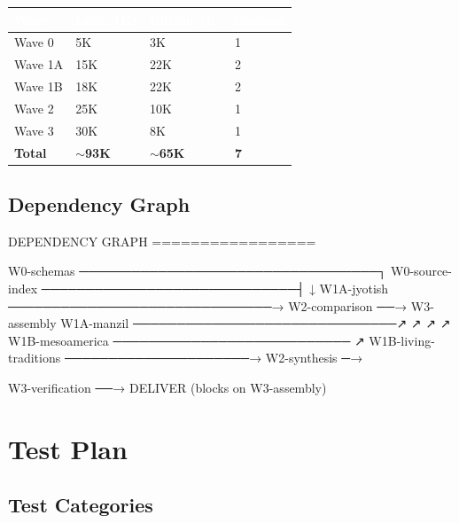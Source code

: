 \documentclass[11pt,letterpaper]{article}
\newcommand{\tableheader}[1]{\textbf{\sffamily\textcolor{white}{#1}}}
\begin{document}
\begin{center}
\begin{tabularx}{\textwidth}{L{3cm}C{2cm}C{2cm}C{2cm}}
\toprule
{}
\tableheader{Wave} & \tableheader{Input (K)} & \tableheader{Output (K)} & \tableheader{Sessions} \\
\midrule
Wave 0 & 5K & 3K & 1 \\
Wave 1A & 15K & 22K & 2 \\
Wave 1B & 18K & 22K & 2 \\
Wave 2 & 25K & 10K & 1 \\
Wave 3 & 30K & 8K & 1 \\
\midrule
\textbf{Total} & \textbf{$\sim$93K} & \textbf{$\sim$65K} & \textbf{7} \\
\bottomrule
\end{tabularx}
\end{center}

\subsection{Dependency Graph}

\begin{asciibox}
DEPENDENCY GRAPH
=================

W0-schemas ──────────────────────────────────┐
W0-source-index ─────────────────────────────┤
                                             ↓
W1A-jyotish  ──────────────────────────────→ W2-comparison ──→ W3-assembly
W1A-manzil   ──────────────────────────────↗                ↗
                                           ↗               ↗
W1B-mesoamerica ───────────────────────────             ↗
W1B-living-traditions ─────────────────────→ W2-synthesis ─→

                                         W3-verification ──→ DELIVER
                                         (blocks on W3-assembly)
\end{asciibox}

\section{Test Plan}

\subsection{Test Categories}
\end{document}
